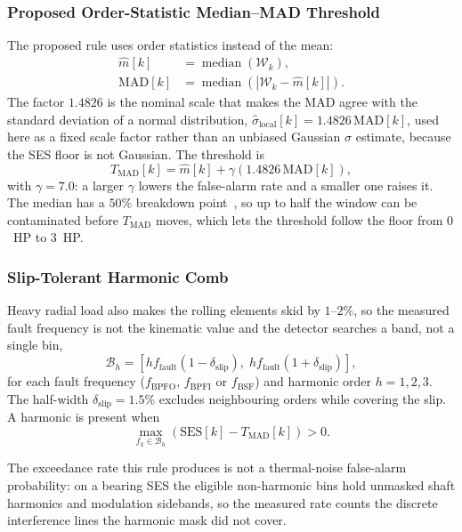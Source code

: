 \subsubsection{Proposed Order-Statistic Median--MAD Threshold}
The proposed rule uses order statistics instead of the mean:
\begin{equation}
\begin{aligned}
  \hat{m}[k] &= \operatorname{median}\left(\mathcal{W}_k\right),\\
  \text{MAD}[k] &= \operatorname{median}\left(\left|\mathcal{W}_k-\hat{m}[k]\right|\right).
\end{aligned}
  \label{eq:medmad}
\end{equation}
The factor $1.4826$ is the nominal scale that makes the MAD agree with the
standard deviation of a normal distribution, $\hat{\sigma}_{\text{local}}[k]
=1.4826\,\text{MAD}[k]$, used here as a fixed scale factor rather than an
unbiased Gaussian $\sigma$ estimate, because the SES floor is not Gaussian. The
threshold is
\begin{equation}
  T_{\text{MAD}}[k]=\hat{m}[k]+\gamma\left(1.4826\,\text{MAD}[k]\right),
  \label{eq:tmad}
\end{equation}
with $\gamma=7.0$: a larger $\gamma$ lowers the false-alarm rate and a smaller
one raises it. The median has a $50\%$ breakdown point~\cite{huber}, so up to
half the window can be contaminated before $T_{\text{MAD}}$ moves, which lets
the threshold follow the floor from $0$~HP to $3$~HP.

\subsubsection{Slip-Tolerant Harmonic Comb}
Heavy radial load also makes the rolling elements skid by $1$--$2\%$, so the
measured fault frequency is not the kinematic value and the detector searches a
band, not a single bin,
\begin{equation}
  \mathcal{B}_h=\left[hf_{\text{fault}}(1-\delta_{\text{slip}}),\;
  hf_{\text{fault}}(1+\delta_{\text{slip}})\right],
  \label{eq:comb}
\end{equation}
for each fault frequency ($f_{\text{BPFO}}$, $f_{\text{BPFI}}$ or
$f_{\text{BSF}}$) and harmonic order $h=1,2,3$. The half-width
$\delta_{\text{slip}}=1.5\%$ excludes neighbouring orders while covering the
slip. A harmonic is present when
\begin{equation}
  \max_{f_k\in\mathcal{B}_h}\left(\text{SES}[k]-T_{\text{MAD}}[k]\right) > 0.
  \label{eq:decision}
\end{equation}

The exceedance rate this rule produces is not a thermal-noise false-alarm
probability: on a bearing SES the eligible non-harmonic bins hold unmasked
shaft harmonics and modulation sidebands, so the measured rate counts the
discrete interference lines the harmonic mask did not cover.
